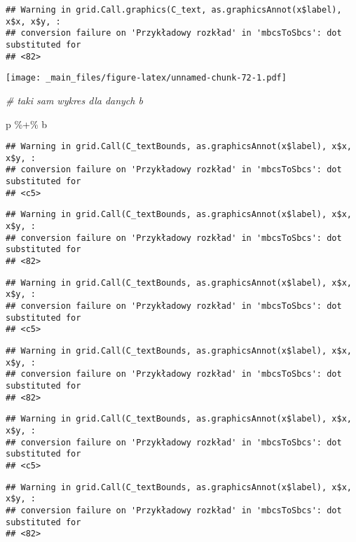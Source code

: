 \documentclass[
]{book}
\newenvironment{Shaded}{\begin{snugshade}}{\end{snugshade}}
\newcommand{\CommentTok}[1]{\textcolor[rgb]{0.56,0.35,0.01}{\textit{#1}}}
\newcommand{\NormalTok}[1]{#1}
\newcommand{\SpecialCharTok}[1]{\textcolor[rgb]{0.00,0.00,0.00}{#1}}
\begin{document}
\begin{verbatim}
## Warning in grid.Call.graphics(C_text, as.graphicsAnnot(x$label), x$x, x$y, :
## conversion failure on 'Przykładowy rozkład' in 'mbcsToSbcs': dot substituted for
## <82>
\end{verbatim}

\texttt{[image: \_main\_files/figure-latex/unnamed-chunk-72-1.pdf]}

\begin{Shaded}
\begin{Highlighting}[]
\CommentTok{\# taki sam wykres dla danych b}

\NormalTok{p }\SpecialCharTok{\%+\%}\NormalTok{ b}
\end{Highlighting}
\end{Shaded}

\begin{verbatim}
## Warning in grid.Call(C_textBounds, as.graphicsAnnot(x$label), x$x, x$y, :
## conversion failure on 'Przykładowy rozkład' in 'mbcsToSbcs': dot substituted for
## <c5>
\end{verbatim}

\begin{verbatim}
## Warning in grid.Call(C_textBounds, as.graphicsAnnot(x$label), x$x, x$y, :
## conversion failure on 'Przykładowy rozkład' in 'mbcsToSbcs': dot substituted for
## <82>
\end{verbatim}

\begin{verbatim}
## Warning in grid.Call(C_textBounds, as.graphicsAnnot(x$label), x$x, x$y, :
## conversion failure on 'Przykładowy rozkład' in 'mbcsToSbcs': dot substituted for
## <c5>
\end{verbatim}

\begin{verbatim}
## Warning in grid.Call(C_textBounds, as.graphicsAnnot(x$label), x$x, x$y, :
## conversion failure on 'Przykładowy rozkład' in 'mbcsToSbcs': dot substituted for
## <82>
\end{verbatim}

\begin{verbatim}
## Warning in grid.Call(C_textBounds, as.graphicsAnnot(x$label), x$x, x$y, :
## conversion failure on 'Przykładowy rozkład' in 'mbcsToSbcs': dot substituted for
## <c5>
\end{verbatim}

\begin{verbatim}
## Warning in grid.Call(C_textBounds, as.graphicsAnnot(x$label), x$x, x$y, :
## conversion failure on 'Przykładowy rozkład' in 'mbcsToSbcs': dot substituted for
## <82>
\end{verbatim}
\end{document}
